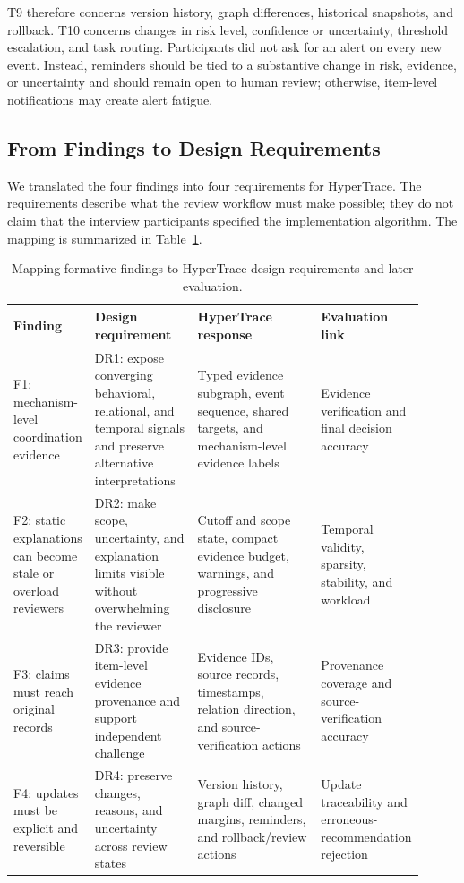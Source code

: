 T9 therefore concerns version history, graph differences, historical
snapshots, and rollback. T10 concerns changes in risk level, confidence or
uncertainty, threshold escalation, and task routing. Participants did not ask
for an alert on every new event. Instead, reminders should be tied to a
substantive change in risk, evidence, or uncertainty and should remain open to
human review; otherwise, item-level notifications may create alert fatigue.

\subsection{From Findings to Design Requirements}
\label{sec:formative-requirements}

We translated the four findings into four requirements for HyperTrace. The
requirements describe what the review workflow must make possible; they do not
claim that the interview participants specified the implementation algorithm.
The mapping is summarized in Table~\ref{tab:formative-requirements}.

\begin{table}[t]
  \centering
  \caption{Mapping formative findings to HyperTrace design requirements and later evaluation.}
  \label{tab:formative-requirements}
  \begin{tabular}{p{0.18\linewidth}p{0.25\linewidth}p{0.30\linewidth}p{0.18\linewidth}}
    \toprule
    Finding & Design requirement & HyperTrace response & Evaluation link\\
    \midrule
    F1: mechanism-level coordination evidence & DR1: expose converging behavioral, relational, and temporal signals and preserve alternative interpretations & Typed evidence subgraph, event sequence, shared targets, and mechanism-level evidence labels & Evidence verification and final decision accuracy\\
    F2: static explanations can become stale or overload reviewers & DR2: make scope, uncertainty, and explanation limits visible without overwhelming the reviewer & Cutoff and scope state, compact evidence budget, warnings, and progressive disclosure & Temporal validity, sparsity, stability, and workload\\
    F3: claims must reach original records & DR3: provide item-level evidence provenance and support independent challenge & Evidence IDs, source records, timestamps, relation direction, and source-verification actions & Provenance coverage and source-verification accuracy\\
    F4: updates must be explicit and reversible & DR4: preserve changes, reasons, and uncertainty across review states & Version history, graph diff, changed margins, reminders, and rollback/review actions & Update traceability and erroneous-recommendation rejection\\
    \bottomrule
  \end{tabular}
\end{table}

